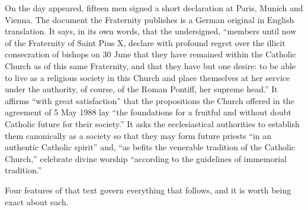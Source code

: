 On the day  appeared, fifteen men signed a short
declaration at Paris, Munich and Vienna. The document the Fraternity
publishes is a German original in English translation. It says, in its
own words, that the undersigned, ``members until now of the Fraternity of
Saint Pius X, declare with profound regret over the illicit consecration
of bishops on 30 June that they have remained within the Catholic Church
as  of this same Fraternity, and that they have but
one desire: to be able to live as a religious society in this Church and
place themselves at her service under the authority, of course, of the
Roman Pontiff, her supreme head.'' It affirms ``with great
satisfaction'' that the propositions the Church offered in the agreement
of 5 May 1988 lay ``the foundations for a fruitful and without doubt
Catholic future for their society.'' It asks the ecclesiastical
authorities to establish them canonically as a society so that they may
form future priests ``in an authentic Catholic spirit'' and, ``as befits
the venerable tradition of the Catholic Church,'' celebrate divine
worship ``according to the guidelines of immemorial
tradition.''

Four features of that text govern everything that follows, and it is
worth being exact about each.

